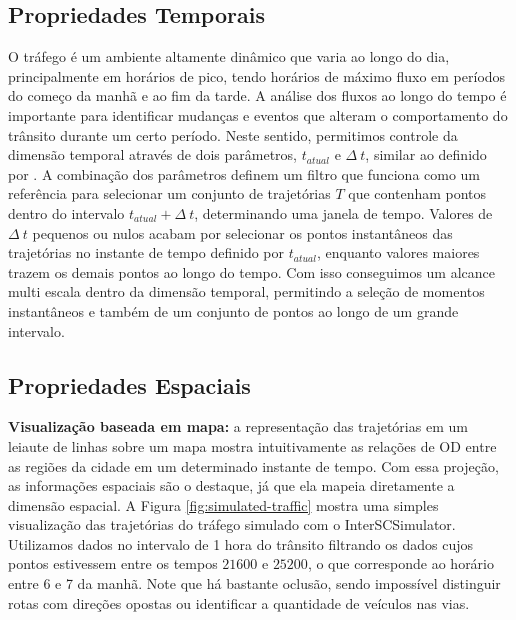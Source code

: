 \subsection{Propriedades Temporais}
O tráfego é um ambiente altamente dinâmico que varia ao longo do
dia, principalmente em horários de pico, tendo horários de máximo fluxo em
períodos do começo da manhã e ao fim da tarde. A análise dos fluxos ao
longo do tempo é importante para identificar mudanças e eventos que alteram o
comportamento do trânsito durante um certo período. Neste sentido, permitimos
controle da dimensão temporal através de dois parâmetros, $t_{atual}$ e
$\Delta~t$, similar ao definido por \citet{Klein2013}. A combinação dos
parâmetros definem um filtro que funciona como um referência para selecionar um
conjunto de trajetórias  ${T}$ que contenham pontos dentro do intervalo
$t_{atual} + \Delta~t$, determinando uma janela de tempo. Valores de $\Delta~t$
pequenos ou nulos acabam por selecionar os pontos instantâneos das trajetórias
no instante de tempo definido por $t_{atual}$, enquanto valores maiores trazem
os demais pontos ao longo do tempo. Com isso conseguimos um alcance multi
escala dentro da dimensão temporal, permitindo a seleção de momentos
instantâneos e também de um conjunto de pontos ao longo de um grande intervalo.

\subsection{Propriedades Espaciais}

\textbf{Visualização baseada em mapa:} a representação das trajetórias em um
leiaute de linhas sobre um mapa mostra intuitivamente as relações de OD entre
as regiões da cidade em um determinado instante de tempo. Com essa projeção, as
informações espaciais são o destaque, já que ela mapeia diretamente a dimensão
espacial. A Figura \ref{fig:simulated-traffic} mostra uma simples visualização das
trajetórias do tráfego simulado com o InterSCSimulator. Utilizamos dados no
intervalo de 1 hora do trânsito filtrando os dados cujos pontos estivessem
entre os tempos $21600$ e $25200$, o que corresponde ao horário entre 6 e 7 da
manhã. Note que há bastante oclusão, sendo impossível distinguir rotas com
direções opostas ou identificar a quantidade de veículos nas vias.

